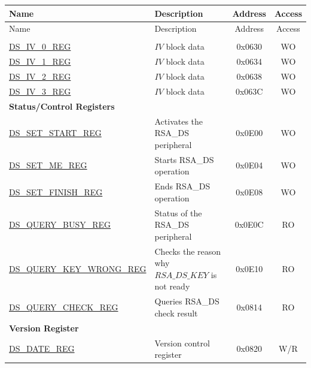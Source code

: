 \begin{longtable}{ | p{5.2cm} | p{6.6cm} | c| c| }
\hline\rowcolor{lightgray}
Name & Description &  Address & Access \\ \hline
\endfirsthead
        \hline
        \rowcolor{lightgray}
Name & Description &  Address & Access \\ \hline

        \endhead
        \endfoot
\multicolumn{4}{|l|}{\textbf{Configuration Registers}} \\ \hline
\hyperref[regdesc:DSIVREG]{DS\_IV\_0\_REG}               & \begin{math}IV\end{math} block data         & 0x0630 & WO \\ \hline
\hyperref[regdesc:DSIVREG]{DS\_IV\_1\_REG}               & \begin{math}IV\end{math} block data          & 0x0634 & WO \\ \hline
\hyperref[regdesc:DSIVREG]{DS\_IV\_2\_REG}               & \begin{math}IV\end{math} block data          & 0x0638 & WO \\ \hline
\hyperref[regdesc:DSIVREG]{DS\_IV\_3\_REG}               & \begin{math}IV\end{math} block data           & 0x063C & WO \\ \hline
\multicolumn{4}{|l|}{\textbf{Status/Control Registers}} \\ \hline
\hyperref[regdesc:DSSETSTARTREG]{DS\_SET\_START\_REG}               & Activates the RSA\_DS peripheral     & 0x0E00 & WO \\ \hline
\hyperref[regdesc:DSSETMEREG]{DS\_SET\_ME\_REG}                     & Starts RSA\_DS operation       & 0x0E04 & WO \\ \hline
\hyperref[regdesc:DSSETFINISHREG]{DS\_SET\_FINISH\_REG}             & Ends RSA\_DS operation         & 0x0E08 & WO \\ \hline
\hyperref[regdesc:DSQUERYBUSYREG]{DS\_QUERY\_BUSY\_REG}             & Status of the RSA\_DS peripheral & 0x0E0C & RO \\ \hline
\hyperref[regdesc:DSQUERYKEYWRONGREG]{DS\_QUERY\_KEY\_WRONG\_REG}   & Checks the reason why \begin{math}RSA\_DS\_KEY\end{math} is not ready       & 0x0E10 & RO \\ \hline
\hyperref[regdesc:DSQUERYCHECKREG]{DS\_QUERY\_CHECK\_REG}           & Queries RSA\_DS check result    & 0x0814 & RO \\ \hline
\multicolumn{4}{|l|}{\textbf{Version Register}} \\ \hline
\hyperref[regdesc:DSDATEREG]{DS\_DATE\_REG}                   & Version control register   & 0x0820 & W/R \\ \hline
\end{longtable}

